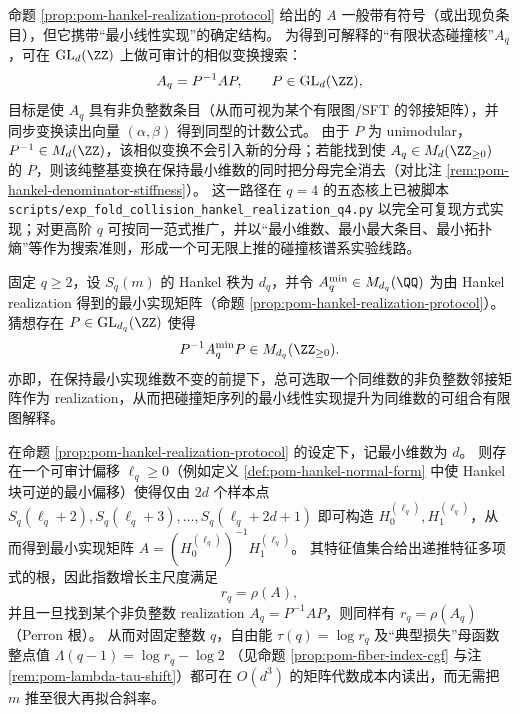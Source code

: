 \begin{remark}\label{rem:pom-nonneg-kernel-search-protocol}
命题 \ref{prop:pom-hankel-realization-protocol} 给出的 \(A\) 一般带有符号（或出现负条目），但它携带“最小线性实现”的确定结构。
为得到可解释的“有限状态碰撞核”\(A_q\)，可在 \(\mathrm{GL}_d(\ZZ)\) 上做可审计的相似变换搜索：
\[
A_q=P^{-1}AP,\qquad P\in\mathrm{GL}_d(\ZZ),
\]
目标是使 \(A_q\) 具有非负整数条目（从而可视为某个有限图/SFT 的邻接矩阵），并同步变换读出向量 \((\alpha,\beta)\) 得到同型的计数公式。
由于 \(P\) 为 unimodular，\(P^{-1}\in M_d(\ZZ)\)，该相似变换不会引入新的分母；若能找到使 \(A_q\in M_d(\ZZ_{\ge 0})\) 的 \(P\)，则该纯整基变换在保持最小维数的同时把分母完全消去（对比注 \ref{rem:pom-hankel-denominator-stiffness}）。
这一路径在 \(q=4\) 的五态核上已被脚本 \texttt{scripts/exp\_fold\_collision\_hankel\_realization\_q4.py} 以完全可复现方式实现；对更高阶 \(q\) 可按同一范式推广，并以“最小维数、最小最大条目、最小拓扑熵”等作为搜索准则，形成一个可无限上推的碰撞核谱系实验线路。
\end{remark}

\begin{conjecture}\label{conj:pom-minimal-hankel-kernelization}
固定 \(q\ge 2\)，设 \(S_q(m)\) 的 Hankel 秩为 \(d_q\)，并令 \(A_q^{\mathrm{min}}\in M_{d_q}(\QQ)\) 为由 Hankel realization 得到的最小实现矩阵（命题 \ref{prop:pom-hankel-realization-protocol}）。
猜想存在 \(P\in\mathrm{GL}_{d_q}(\ZZ)\) 使得
\[
P^{-1}A_q^{\mathrm{min}}P\in M_{d_q}(\ZZ_{\ge 0}).
\]
亦即，在保持最小实现维数不变的前提下，总可选取一个同维数的非负整数邻接矩阵作为 realization，从而把碰撞矩序列的最小线性实现提升为同维数的可组合有限图解释。
\end{conjecture}

\begin{corollary}\label{cor:pom-hankel-free-energy-evaluator}
在命题 \ref{prop:pom-hankel-realization-protocol} 的设定下，记最小维数为 \(d\)。
则存在一个可审计偏移 \(\ell_q\ge 0\)（例如定义 \ref{def:pom-hankel-normal-form} 中使 Hankel 块可逆的最小偏移）使得仅由 \(2d\) 个样本点
\(
S_q(\ell_q+2),S_q(\ell_q+3),\dots,S_q(\ell_q+2d+1)
\)
即可构造 \(H_0^{(\ell_q)},H_1^{(\ell_q)}\)，从而得到最小实现矩阵 \(A=(H_0^{(\ell_q)})^{-1}H_1^{(\ell_q)}\)。
其特征值集合给出递推特征多项式的根，因此指数增长主尺度满足
\[
r_q=\rho(A),
\]
并且一旦找到某个非负整数 realization \(A_q=P^{-1}AP\)，则同样有 \(r_q=\rho(A_q)\)（Perron 根）。
从而对固定整数 \(q\)，自由能 \(\tau(q)=\log r_q\) 及“典型损失”母函数整点值
\(
\Lambda(q-1)=\log r_q-\log2
\)
（见命题 \ref{prop:pom-fiber-index-cgf} 与注 \ref{rem:pom-lambda-tau-shift}）都可在 \(O(d^3)\) 的矩阵代数成本内读出，而无需把 \(m\) 推至很大再拟合斜率。
\end{corollary}

